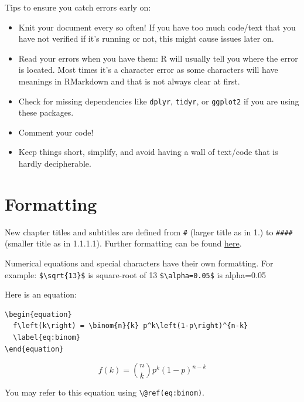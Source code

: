 \documentclass[
]{book}
\providecommand{\tightlist}{%
  \setlength{\itemsep}{0pt}\setlength{\parskip}{0pt}}
\begin{document}
Tips to ensure you catch errors early on:

\begin{itemize}
\tightlist
\item
  Knit your document every so often! If you have too much code/text that you have not verified if it's running or not, this might cause issues later on.
\item
  Read your errors when you have them: R will usually tell you where the error is located. Most times it's a character error as some characters will have meanings in RMarkdown and that is not always clear at first.
\item
  Check for missing dependencies like \texttt{dplyr}, \texttt{tidyr}, or \texttt{ggplot2} if you are using these packages.
\item
  Comment your code!
\item
  Keep things short, simplify, and avoid having a wall of text/code that is hardly decipherable.
\end{itemize}

\hypertarget{formatting}{%
\section{Formatting}\label{formatting}}

New chapter titles and subtitles are defined from \texttt{\#} (larger title as in 1.) to \texttt{\#\#\#\#} (smaller title as in 1.1.1.1). Further formatting can be found \href{https://bookdown.org/yihui/rmarkdown-cookbook/formatting.html}{here}.

Numerical equations and special characters have their own formatting. For example: \texttt{\$\textbackslash{}sqrt\{13\}\$} is square-root of 13 \texttt{\$\textbackslash{}alpha=0.05\$} is alpha=0.05

Here is an equation:

\begin{verbatim}
\begin{equation} 
  f\left(k\right) = \binom{n}{k} p^k\left(1-p\right)^{n-k}
  \label{eq:binom}
\end{equation}
\end{verbatim}

\begin{equation} 
  f\left(k\right) = \binom{n}{k} p^k\left(1-p\right)^{n-k}
  \label{eq:binom}
\end{equation}

You may refer to this equation using \texttt{\textbackslash{}@ref(eq:binom)}.
\end{document}

